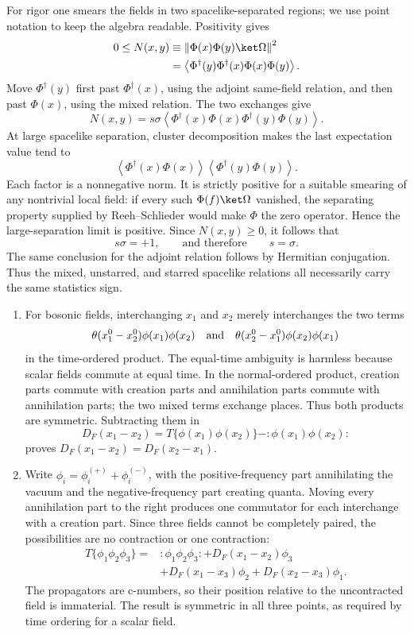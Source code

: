 \begin{enumerate}
For rigor one smears the fields in two spacelike-separated regions; we use
point notation to keep the algebra readable.  Positivity gives
\[
\begin{split}
 0\leq N(x,y)
 &\equiv\left\|\Phi(x)\Phi(y)\ket\Omega\right\|^2\\
 &=\left\langle
 \Phi^\dagger(y)\Phi^\dagger(x)\Phi(x)\Phi(y)
 \right\rangle.
\end{split}
\]
Move \(\Phi^\dagger(y)\) first past \(\Phi^\dagger(x)\), using the
adjoint same-field relation, and then past \(\Phi(x)\), using the mixed
relation.  The two exchanges give
\[
 N(x,y)=s\sigma
 \left\langle
 \Phi^\dagger(x)\Phi(x)\Phi^\dagger(y)\Phi(y)
 \right\rangle.
\]
At large spacelike separation, cluster decomposition makes the last
expectation value tend to
\[
 \left\langle\Phi^\dagger(x)\Phi(x)\right\rangle
 \left\langle\Phi^\dagger(y)\Phi(y)\right\rangle.
\]
Each factor is a nonnegative norm.  It is strictly positive for a suitable
smearing of any nontrivial local field: if every such
\(\Phi(f)\ket\Omega\) vanished, the separating property supplied by
Reeh--Schlieder would make \(\Phi\) the zero operator.  Hence the
large-separation limit is positive.  Since \(N(x,y)\geq0\), it follows
that
\[
 s\sigma=+1,
 \qquad\text{and therefore}\qquad s=\sigma.
\]
The same conclusion for the adjoint relation follows by Hermitian
conjugation.  Thus the mixed, unstarred, and starred spacelike relations
all necessarily carry the same statistics sign.

\begin{enumerate}
\item
For bosonic fields, interchanging \(x_1\) and \(x_2\) merely interchanges
the two terms
\[
 \theta(x_1^0-x_2^0)\phi(x_1)\phi(x_2)
 \quad\hbox{and}\quad
 \theta(x_2^0-x_1^0)\phi(x_2)\phi(x_1)
\]
in the time-ordered product.  The equal-time ambiguity is harmless
because scalar fields commute at equal time.  In the normal-ordered
product, creation parts commute with creation parts and annihilation
parts commute with annihilation parts; the two mixed terms exchange
places.  Thus both products are symmetric.  Subtracting them in
\[
 D_F(x_1-x_2)
 =T\{\phi(x_1)\phi(x_2)\}
 -:\!\phi(x_1)\phi(x_2)\!:
\]
proves \(D_F(x_1-x_2)=D_F(x_2-x_1)\).
\item
Write \(\phi_i=\phi_i^{(+)}+\phi_i^{(-)}\), with the positive-frequency
part annihilating the vacuum and the negative-frequency part creating
quanta.  Moving every annihilation part to the right produces one
commutator for each interchange with a creation part.  Since three fields
cannot be completely paired, the possibilities are no contraction or one
contraction:
\[
\begin{split}
 T\{\phi_1\phi_2\phi_3\}={}&:\phi_1\phi_2\phi_3:
 +D_F(x_1-x_2)\phi_3\\
 &+D_F(x_1-x_3)\phi_2
 +D_F(x_2-x_3)\phi_1.
\end{split}
\]
The propagators are c-numbers, so their position relative to the
uncontracted field is immaterial.  The result is symmetric in all three
points, as required by time ordering for a scalar field.
\end{enumerate}


\end{enumerate}
